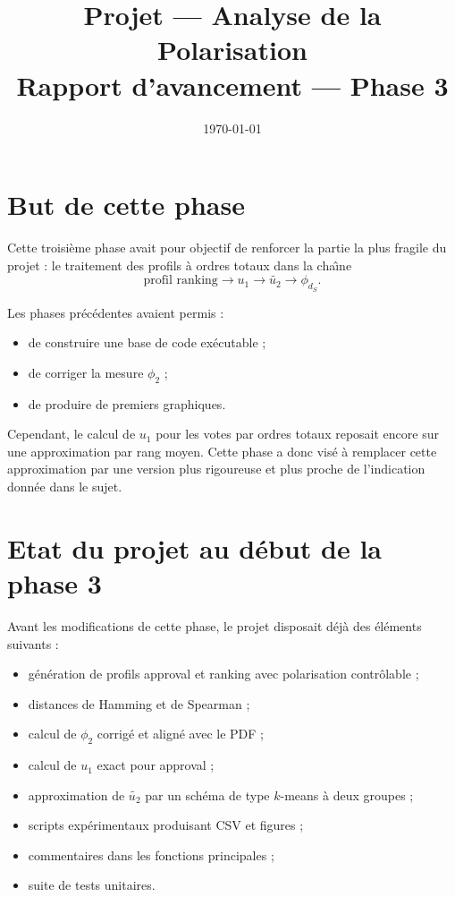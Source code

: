 \documentclass[11pt,a4paper]{article}
\title{Projet --- Analyse de la Polarisation\\\large Rapport d'avancement --- Phase 3}
\author{}
\date{\today}
\begin{document}
\maketitle

\section{But de cette phase}

Cette troisi\`eme phase avait pour objectif de renforcer la partie la plus fragile du projet : le traitement des profils \`a ordres totaux dans la cha\^\i ne
\[
\text{profil ranking} \rightarrow u_1 \rightarrow \widetilde{u_2} \rightarrow \phi_{d_S}.
\]

Les phases pr\'ec\'edentes avaient permis :
\begin{itemize}[leftmargin=*]
    \item de construire une base de code ex\'ecutable ;
    \item de corriger la mesure \(\phi_2\) ;
    \item de produire de premiers graphiques.
\end{itemize}

Cependant, le calcul de \(u_1\) pour les votes par ordres totaux reposait encore sur une approximation par rang moyen. Cette phase a donc vis\'e \`a remplacer cette approximation par une version plus rigoureuse et plus proche de l'indication donn\'ee dans le sujet.

\section{Etat du projet au d\'ebut de la phase 3}

Avant les modifications de cette phase, le projet disposait d\'ej\`a des \'el\'ements suivants :
\begin{itemize}[leftmargin=*]
    \item g\'en\'eration de profils approval et ranking avec polarisation contr\^olable ;
    \item distances de Hamming et de Spearman ;
    \item calcul de \(\phi_2\) corrig\'e et align\'e avec le PDF ;
    \item calcul de \(u_1\) exact pour approval ;
    \item approximation de \(\widetilde{u_2}\) par un sch\'ema de type \(k\)-means \`a deux groupes ;
    \item scripts exp\'erimentaux produisant CSV et figures ;
    \item commentaires dans les fonctions principales ;
    \item suite de tests unitaires.
\end{itemize}
\end{document}
